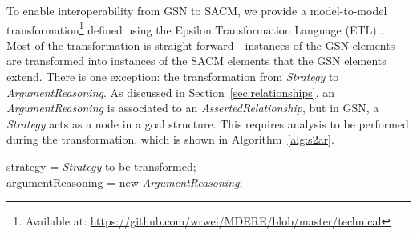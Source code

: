 To enable interoperability from GSN to SACM, we provide a model-to-model transformation\footnote{Available at: \url{https://github.com/wrwei/MDERE/blob/master/technical}} defined using the Epsilon Transformation Language (ETL) \cite{kolovos2008epsilon}. 
Most of the transformation is straight forward - instances of the GSN elements are transformed into instances of the SACM elements that the GSN elements extend. 
There is one exception: the transformation from \textit{Strategy} to \textit{ArgumentReasoning}. As discussed in Section~\ref{sec:relationships}, an \textit{ArgumentReasoning} is associated to an \textit{AssertedRelationship}, but in GSN, a \textit{Strategy} acts as a node in a goal structure. 
This requires analysis to be performed during the transformation, which is shown in Algorithm~\ref{alg:s2ar}.
\begin{algorithm}[ht!]
	{
		\fontsize{9}{10}
		\selectfont
		\SetAlgoLined\DontPrintSemicolon
		
		
		
		\Let strategy = \textit{Strategy} to be transformed;\\
		\Let argumentReasoning = new \textit{ArgumentReasoning};\\
		
}
\end{algorithm}
